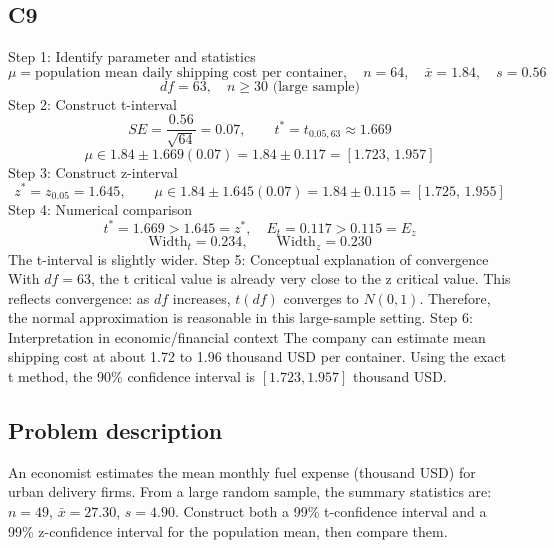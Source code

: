 \begin{ExamProblems}
		\subsection*{C9}
		Step 1: Identify parameter and statistics
		\[
		\mu=\text{population mean daily shipping cost per container},\quad n=64,\quad \bar{x}=1.84,\quad s=0.56
		\]
		\[
		df=63,\quad n\ge 30\text{ (large sample)}
		\]
		Step 2: Construct t-interval
		\[
		SE=\frac{0.56}{\sqrt{64}}=0.07,\qquad t^*=t_{0.05,63}\approx 1.669
		\]
		\[
		\mu\in 1.84\pm 1.669(0.07)=1.84\pm 0.117=[1.723,\,1.957]
		\]
		Step 3: Construct z-interval
		\[
		z^*=z_{0.05}=1.645,\qquad \mu\in 1.84\pm 1.645(0.07)=1.84\pm 0.115=[1.725,\,1.955]
		\]
		Step 4: Numerical comparison
		\[
		t^*=1.669>1.645=z^*,\quad E_t=0.117>0.115=E_z
		\]
		\[
		\text{Width}_t=0.234,\qquad \text{Width}_z=0.230
		\]
		The t-interval is slightly wider.
		Step 5: Conceptual explanation of convergence
		With $df=63$, the t critical value is already very close to the z critical value.
		This reflects convergence: as $df$ increases, $t(df)$ converges to $N(0,1)$.
		Therefore, the normal approximation is reasonable in this large-sample setting.
		Step 6: Interpretation in economic/financial context
		The company can estimate mean shipping cost at about 1.72 to 1.96 thousand USD per container.
		Using the exact t method, the 90\% confidence interval is $[1.723,1.957]$ thousand USD.
		
		\newpage
		\item
		\subsection*{Problem description}
		An economist estimates the mean monthly fuel expense (thousand USD) for urban delivery firms.
		From a large random sample, the summary statistics are: $n=49$, $\bar{x}=27.30$, $s=4.90$.
		Construct both a 99\% t-confidence interval and a 99\% z-confidence interval for the population mean, then compare them.
		

\end{ExamProblems}
